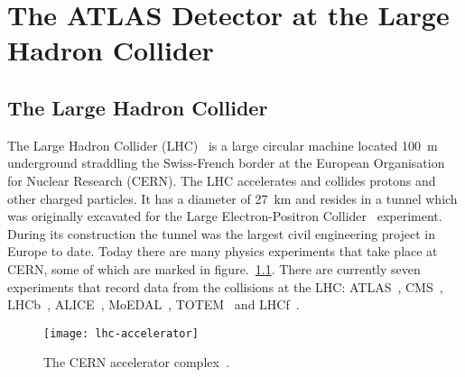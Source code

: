 \chapter{The ATLAS Detector at the Large Hadron Collider}%
\label{ch:detector}

\section{The Large Hadron Collider}%
\label{sec:lhc}%
The Large Hadron Collider (LHC)~\cite{LHC-dr} is a large circular machine
located 100~m underground straddling the Swiss-French border at the European
Organisation for Nuclear Research (CERN). The LHC accelerates and collides
protons and other charged particles. It has a diameter of 27~km and resides in a
tunnel which was originally excavated for the Large Electron-Positron
Collider~\cite{LEP} experiment. During its construction the tunnel was the
largest civil engineering project in Europe to date. Today there are many
physics experiments that take place at CERN, some of which are marked in
figure.~\ref{fig:lhc-acc}. There are currently seven experiments that record
data from the collisions at the LHC: ATLAS~\cite{ATLAS-loi}, CMS~\cite{CMS-loi},
LHCb~\cite{lhcb-loi}, ALICE~\cite{ALICE-loi}, MoEDAL~\cite{MoEDAL-loi},
TOTEM~\cite{TOTEM-loi} and LHCf~\cite{lhcf-loi}.
\begin{figure}[ht]
  \centering
  \texttt{[image: lhc-accelerator]}
  \caption[The CERN accelerator complex]{The CERN accelerator
    complex~\cite{LHC-acc-fig}.}%
  \label{fig:lhc-acc}
\end{figure}


